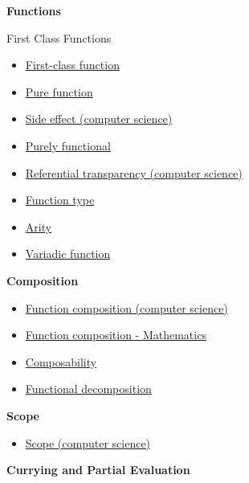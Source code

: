 \documentclass[11pt]{article}
\begin{document}
\textbf{Functions}

First Class Functions

\begin{itemize}
\item \href{https://en.wikipedia.org/wiki/First-class_function}{First-class function}
\item \href{https://en.wikipedia.org/wiki/Pure_function}{Pure function}
\item \href{https://en.wikipedia.org/wiki/Side_effect_\%28computer_science\%29}{Side effect (computer science)}
\item \href{https://en.wikipedia.org/wiki/Purely_functional}{Purely functional}

\item \href{https://en.wikipedia.org/wiki/Referential_transparency_\%28computer_science\%29}{Referential transparency (computer science)}
\item \href{https://en.wikipedia.org/wiki/Function_type}{Function type}

\item \href{https://en.wikipedia.org/wiki/Arity}{Arity}
\item \href{https://en.wikipedia.org/wiki/Variadic_function}{Variadic function}
\end{itemize}

\textbf{Composition}

\begin{itemize}
\item \href{https://en.wikipedia.org/wiki/Function_composition_\%28computer_science\%29}{Function composition (computer science)}
\item \href{https://en.wikipedia.org/wiki/Function_composition}{Function composition - Mathematics}
\item \href{https://en.wikipedia.org/wiki/Composability}{Composability}

\item \href{https://en.wikipedia.org/wiki/Functional_decomposition}{Functional decomposition}
\end{itemize}

\textbf{Scope}

\begin{itemize}
\item \href{https://en.wikipedia.org/wiki/Scope_\%28computer_science\%29}{Scope (computer science)}
\end{itemize}

\textbf{Currying and Partial Evaluation}
\end{document}
